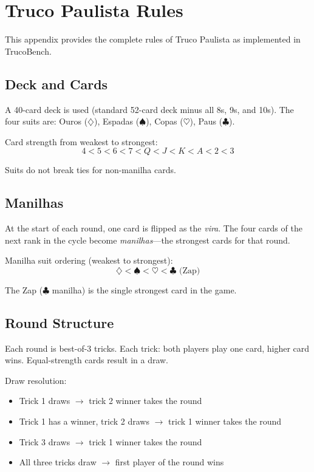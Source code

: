 \section{Truco Paulista Rules}
\label{app:rules}

This appendix provides the complete rules of Truco Paulista as implemented in TrucoBench.

\subsection{Deck and Cards}

A 40-card deck is used (standard 52-card deck minus all 8s, 9s, and 10s). The four suits are: Ouros ($\diamondsuit$), Espadas ($\spadesuit$), Copas ($\heartsuit$), Paus ($\clubsuit$).

Card strength from weakest to strongest:
$$4 < 5 < 6 < 7 < Q < J < K < A < 2 < 3$$

Suits do not break ties for non-manilha cards.

\subsection{Manilhas}

At the start of each round, one card is flipped as the \emph{vira}. The four cards of the next rank in the cycle become \emph{manilhas}---the strongest cards for that round.

Manilha suit ordering (weakest to strongest):
$$\diamondsuit < \spadesuit < \heartsuit < \clubsuit \text{ (Zap)}$$

The Zap ($\clubsuit$ manilha) is the single strongest card in the game.

\subsection{Round Structure}

Each round is best-of-3 tricks. Each trick: both players play one card, higher card wins. Equal-strength cards result in a draw.

Draw resolution:
\begin{itemize}
    \item Trick 1 draws $\to$ trick 2 winner takes the round
    \item Trick 1 has a winner, trick 2 draws $\to$ trick 1 winner takes the round
    \item Trick 3 draws $\to$ trick 1 winner takes the round
    \item All three tricks draw $\to$ first player of the round wins
\end{itemize}

